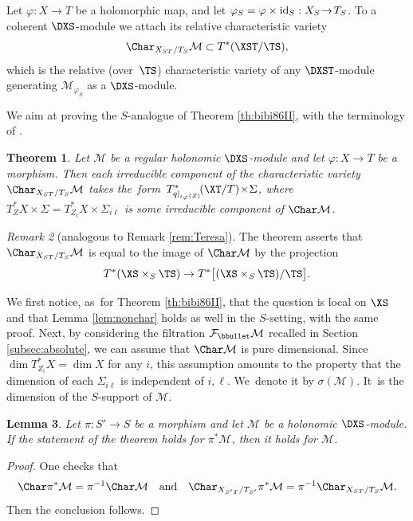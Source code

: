 \documentclass{amsart}
\theoremstyle{plain}
\newtheorem{theorem}{Theorem}
\numberwithin{theorem}{section}
\newtheorem{lemma}[theorem]{Lemma}
\theoremstyle{definition}
\theoremstyle{remark}
\newtheorem{remark}[theorem]{Remark}
\theoremstyle{definition}
\newcommand{\cF}{\mathcal{F}}
\newcommand{\cM}{\mathcal{M}}
\newcommand{\id}{\textup{id}}
\begin{document}
Let $\varphi:X\!\to\! T$ be a holomorphic map, and let $\varphi_S=\varphi\times\id_S:X_S\!\to\! T_S$. To a coherent $\DXS$-module we attach its relative characteristic variety
\[
\Char_{X_{ST}/T_S}\cM\subset T^*(\XST/\TS),
\]
which is the relative (over~$\TS$) characteristic variety of any $\DXST$-module generating $\cM_{\varphi_S}$ as a $\DXS$-module.

We aim at proving the $S$-analogue of Theorem \ref{th:bibi86II}, with the terminology of \cite{FFS23}.

\begin{theorem}\label{th:bibi86IIrel}
Let $\cM$ be a regular holonomic $\DXS$-module and let \hbox{$\varphi:X\!\to\! T$} be a morphism. Then each irreducible component of the characteristic variety $\Char_{X_{ST}/T_S}\cM$ takes the~form~\hbox{$T^*_{q|_{\iota_\varphi(Z)}}\!(\XT/T)\!\times\! \Sigma$}, where $T^*_{Z}X\times \Sigma=T^*_{Z_i}X\times \Sigma_{i\ell}$ is some irreducible component of $\Char\cM$.
\end{theorem}

\begin{remark}[analogous to Remark \ref{rem:Teresa}]
The theorem asserts that $\Char_{X_{ST}/T_S}\cM$ is equal to the image of $\Char\cM$ by the projection
\[
T^*(\XS\times_S\TS)\to T^*\bigl[(\XS\times_S\TS)/\TS\bigr].
\]
\end{remark}

We first notice, as~for Theorem \ref{th:bibi86II}, that the question is local on $\XS$ and that Lemma \ref{lem:nonchar} holds as well in the $S$-setting, with the same proof. Next, by considering the filtration $\cF_\bbullet\cM$ recalled in Section \ref{subsec:absolute}, we can assume that $\Char\cM$ is pure dimensional. Since $\dim T^*_{Z_i}X=\dim X$ for any $i$, this assumption amounts to the property that the dimension of each $\Sigma_{i\ell}$ is independent of $i,\ell$. We~denote it by $\sigma(\cM)$. It~is the dimension of the $S$-support of $\cM$.

\begin{lemma}\label{lem:basechange}
Let $\pi:S'\to S$ be a morphism and let $\cM$ be a holonomic $\DXS$-module. If the statement of the theorem holds for $\pi^*\cM$, then it holds for $\cM$.
\end{lemma}

\begin{proof}
One checks that
\[
\Char\pi^*\cM=\pi^{-1}\Char\cM\quad\text{and}\quad \Char_{X_{S'T}/T_{S'}}\pi^*\cM=\pi^{-1}\Char_{X_{ST}/T_S}\cM.
\]
Then the conclusion follows.
\end{proof}
\end{document}

